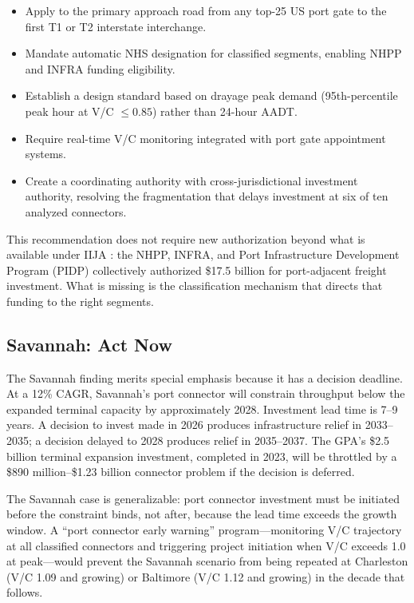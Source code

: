 \begin{itemize}
  \item Apply to the primary approach road from any top-25 US port gate to the first T1 or T2 interstate interchange.
  \item Mandate automatic NHS designation for classified segments, enabling NHPP and INFRA funding eligibility.
  \item Establish a design standard based on drayage peak demand (95th-percentile peak hour at V/C $\leq 0.85$) rather than 24-hour AADT.
  \item Require real-time V/C monitoring integrated with port gate appointment systems.
  \item Create a coordinating authority with cross-jurisdictional investment authority, resolving the fragmentation that delays investment at six of ten analyzed connectors.
\end{itemize}

This recommendation does not require new authorization beyond what is available under IIJA \citep{IIJA2021}: the NHPP, INFRA, and Port Infrastructure Development Program (PIDP) collectively authorized \$17.5 billion for port-adjacent freight investment. What is missing is the classification mechanism that directs that funding to the right segments.

\subsection{Savannah: Act Now}

The Savannah finding merits special emphasis because it has a decision deadline. At a 12\% CAGR, Savannah's port connector will constrain throughput below the expanded terminal capacity by approximately 2028. Investment lead time is 7--9 years. A decision to invest made in 2026 produces infrastructure relief in 2033--2035; a decision delayed to 2028 produces relief in 2035--2037. The GPA's \$2.5 billion terminal expansion investment, completed in 2023, will be throttled by a \$890 million--\$1.23 billion connector problem if the decision is deferred.

The Savannah case is generalizable: port connector investment must be initiated before the constraint binds, not after, because the lead time exceeds the growth window. A ``port connector early warning'' program---monitoring V/C trajectory at all classified connectors and triggering project initiation when V/C exceeds 1.0 at peak---would prevent the Savannah scenario from being repeated at Charleston (V/C 1.09 and growing) or Baltimore (V/C 1.12 and growing) in the decade that follows.

